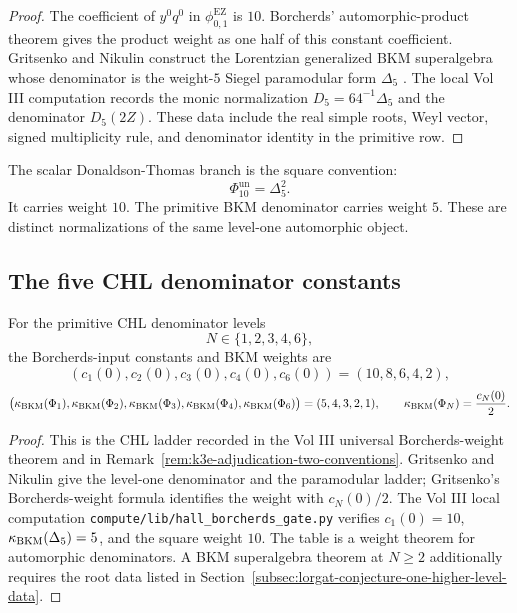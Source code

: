 \begin{proof}
The coefficient of \(y^0q^0\) in
\(\phi_{0,1}^{\mathrm{EZ}}\) is \(10\). Borcherds' automorphic-product
theorem gives the product weight as one half of this constant
coefficient. Gritsenko and Nikulin construct the Lorentzian
generalized BKM superalgebra whose denominator is the weight-\(5\)
Siegel paramodular form \(\Delta_5\)
\cite{GritsenkoNikulin1995,GritsenkoNikulin1998,Borcherds1995,Gritsenko1999}.
The local Vol III computation records the monic normalization
\(D_5=64^{-1}\Delta_5\) and the denominator \(D_5(2Z)\). These data
include the real simple roots, Weyl vector, signed multiplicity rule,
and denominator identity in the primitive row.
\end{proof}

The scalar Donaldson-Thomas branch is the square convention:
\[
  \Phi_{10}^{\mathrm{un}}=\Delta_5^2 .
\]
It carries weight \(10\). The primitive BKM denominator carries weight
\(5\). These are distinct normalizations of the same level-one
automorphic object.

\subsection{The five CHL denominator constants}
\label{subsec:lorgat-conjecture-one-chl-constants}

\begin{proposition}
\label{prop:lorgat-conjecture-one-chl-constants}
For the primitive CHL denominator levels
\[
  N\in\{1,2,3,4,6\},
\]
the Borcherds-input constants and BKM weights are
\[
  (c_1(0),c_2(0),c_3(0),c_4(0),c_6(0))
  =(10,8,6,4,2),
\]
\[
  \bigl(\kappa_{\mathrm{BKM}}(\Phi_1),\kappa_{\mathrm{BKM}}(\Phi_2),\kappa_{\mathrm{BKM}}(\Phi_3),
  \kappa_{\mathrm{BKM}}(\Phi_4),\kappa_{\mathrm{BKM}}(\Phi_6)\bigr)
  =(5,4,3,2,1),
  \qquad
  \kappa_{\mathrm{BKM}}(\Phi_N)=\frac{c_N(0)}{2}.
\]
\end{proposition}

\begin{proof}
This is the CHL ladder recorded in the Vol III universal
Borcherds-weight theorem and in
Remark~\ref{rem:k3e-adjudication-two-conventions}. Gritsenko and
Nikulin give the level-one denominator and the paramodular ladder;
Gritsenko's Borcherds-weight formula identifies the weight with
\(c_N(0)/2\). The Vol III local computation
\texttt{compute/lib/hall\_borcherds\_gate.py} verifies
\(c_1(0)=10\), \(\kappa_{\mathrm{BKM}}(\Delta_5)=5\), and the square weight \(10\).
The table is a weight theorem for automorphic denominators. A BKM
superalgebra theorem at \(N\geq2\) additionally requires the root data
listed in Section~\ref{subsec:lorgat-conjecture-one-higher-level-data}.
\end{proof}

